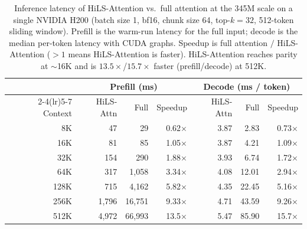 \begin{table}[t]
\centering
\small
\setlength{\tabcolsep}{5pt}
\caption{Inference latency of HiLS-Attention vs.\ full attention at the 345M scale on a single NVIDIA H200 (batch size 1, bf16, chunk size 64, top-$k=32$, 512-token sliding window). Prefill is the warm-run latency for the full input; decode is the median per-token latency with CUDA graphs. Speedup is full attention $/$ HiLS-Attention ($>1$ means HiLS-Attention is faster). HiLS-Attention reaches parity at $\sim$16K and is $13.5\times$/$15.7\times$ faster (prefill/decode) at 512K.}
\label{tab:efficiency}
\begin{tabular}{r rrr rrr}
\toprule
& \multicolumn{3}{c}{Prefill (ms)} & \multicolumn{3}{c}{Decode (ms / token)} \\
\cmidrule(lr){2-4}\cmidrule(lr){5-7}
Context & HiLS-Attn & Full & Speedup & HiLS-Attn & Full & Speedup \\
\midrule
8K   & 47    & 29     & 0.62$\times$ & 3.87 & 2.83  & 0.73$\times$ \\
16K  & 81    & 85     & 1.05$\times$ & 3.87 & 4.21  & 1.09$\times$ \\
32K  & 154   & 290    & 1.88$\times$ & 3.93 & 6.74  & 1.72$\times$ \\
64K  & 317   & 1{,}058  & 3.34$\times$ & 4.08 & 12.01 & 2.94$\times$ \\
128K & 715   & 4{,}162  & 5.82$\times$ & 4.35 & 22.45 & 5.16$\times$ \\
256K & 1{,}796 & 16{,}751 & 9.33$\times$ & 4.71 & 43.59 & 9.26$\times$ \\
512K & 4{,}972 & 66{,}993 & 13.5$\times$ & 5.47 & 85.90 & 15.7$\times$ \\
\bottomrule
\end{tabular}
\end{table}
